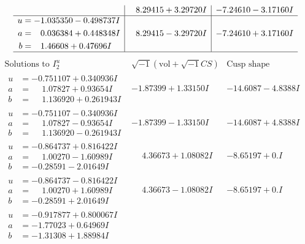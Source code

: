 \documentclass[1p]{elsarticle_modified}
\theoremstyle{definition}
\newcommand{\I}{\sqrt{-1}}
\begin{document}
$$\begin{array}{c|c|c}
 & \phantom{-}8.29415 + 3.29720 I & -7.24610 - 3.17160 I \\ \hline\begin{aligned}
u &= -1.035350 - 0.498737 I \\
a &= \phantom{-}0.036384 + 0.448348 I \\
b &= \phantom{-}1.46608 + 0.47696 I\end{aligned}
 & \phantom{-}8.29415 - 3.29720 I & -7.24610 + 3.17160 I\\
 \hline 
 \end{array}$$\newpage$$\begin{array}{c|c|c}  
\text{Solutions to }I^u_{2}& \I (\text{vol} + \sqrt{-1}CS) & \text{Cusp shape}\\
 \hline 
\begin{aligned}
u &= -0.751107 + 0.340936 I \\
a &= \phantom{-}1.07827 + 0.93654 I \\
b &= \phantom{-}1.136920 + 0.261943 I\end{aligned}
 & -1.87399 + 1.33150 I & -14.6087 - 4.8388 I \\ \hline\begin{aligned}
u &= -0.751107 - 0.340936 I \\
a &= \phantom{-}1.07827 - 0.93654 I \\
b &= \phantom{-}1.136920 - 0.261943 I\end{aligned}
 & -1.87399 - 1.33150 I & -14.6087 + 4.8388 I \\ \hline\begin{aligned}
u &= -0.864737 + 0.816422 I \\
a &= \phantom{-}1.00270 - 1.60989 I \\
b &= -0.28591 - 2.01649 I\end{aligned}
 & \phantom{-}4.36673 + 1.08082 I & -8.65197 + 0. I\phantom{ +0.000000I} \\ \hline\begin{aligned}
u &= -0.864737 - 0.816422 I \\
a &= \phantom{-}1.00270 + 1.60989 I \\
b &= -0.28591 + 2.01649 I\end{aligned}
 & \phantom{-}4.36673 - 1.08082 I & -8.65197 + 0. I\phantom{ +0.000000I} \\ \hline\begin{aligned}
u &= -0.917877 + 0.800067 I \\
a &= -1.77023 + 0.64969 I \\
b &= -1.31308 + 1.88984 I\end{aligned}

\end{array}$$
\end{document}
